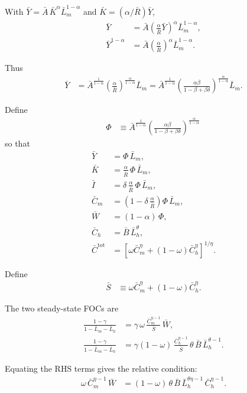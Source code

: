 \documentclass[a4paper,12pt]{article} %
\theoremstyle{nonitalic}
\begin{document}
With $\bar Y=\bar A\,\bar K^{\alpha}\bar L_m^{1-\alpha}$ and $\bar K=(\alpha/\bar R)\bar Y$,
\begin{align}
\bar Y &= \bar A\left(\tfrac{\alpha}{\bar R}\bar Y\right)^{\alpha}\bar L_m^{1-\alpha}, \\
\bar Y^{1-\alpha} &= \bar A\left(\tfrac{\alpha}{\bar R}\right)^{\alpha}\bar L_m^{1-\alpha}.
\end{align}

Thus
\begin{align}
\bar Y &= \bar A^{\tfrac{1}{1-\alpha}}
\left(\frac{\alpha}{\bar R}\right)^{\tfrac{\alpha}{1-\alpha}}
\bar L_m = \bar A^{\frac{1}{1-\alpha}}\left(\frac{\alpha \beta}{1 - \beta + \beta \delta}\right)^{\frac{\alpha}{1-\alpha}}\bar L_m.
\end{align}

Define
\begin{align}
\Phi &\equiv \bar A^{\frac{1}{1-\alpha}}\left(\frac{\alpha \beta}{1 - \beta + \beta \delta}\right)^{\frac{\alpha}{1-\alpha}}\,
\end{align}
so that
\begin{align}
\bar Y &= \Phi\,\bar L_m, \\
\bar K &= \frac{\alpha}{\bar R}\,\Phi\,\bar L_m, \\
\bar I &= \delta\,\frac{\alpha}{\bar R}\,\Phi\,\bar L_m, \\
\bar C_m &= \left(1-\delta\,\frac{\alpha}{\bar R}\right)\Phi\,\bar L_m, \\
\bar W &= (1-\alpha)\,\Phi, \\
\bar C_h &= \bar B\,\bar L_h^{\theta}, \\
\bar C^{\mathrm{tot}} &= \left[\omega \bar C_m^{\eta}+(1-\omega)\bar C_h^{\eta}\right]^{1/\eta}.
\end{align}

Define
\begin{align}
\bar S &\equiv \omega \bar C_m^{\eta}+(1-\omega)\bar C_h^{\eta}.
\end{align}

The two steady-state FOCs are
\begin{align}
\frac{1-\gamma}{1-\bar L_m-\bar L_h}
&= \gamma\,\omega\,\frac{\bar C_m^{\eta-1}}{\bar S}\,\bar W, \\
\frac{1-\gamma}{1-\bar L_m-\bar L_h}
&= \gamma(1-\omega)\,\frac{\bar C_h^{\eta-1}}{\bar S}\,\theta\,\bar B\,\bar L_h^{\theta-1}.
\end{align}

Equating the RHS terms gives the relative condition:
\begin{align}
\omega\,\bar C_m^{\eta-1}\,\bar W
&= (1-\omega)\,\theta\,\bar B\,\bar L_h^{\theta\eta-1}\,\bar C_h^{\eta-1}.
\end{align}
\end{document}
